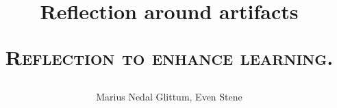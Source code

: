 \documentclass[a4paper, 12pt]{report}
\title{Reflection around artifacts
    \begin{center}
        \textsc{Reflection to enhance learning.}
    \end{center}
}
\author{Marius Nedal Glittum, Even Stene}
\begin{document}
\maketitle
{}





\tableofcontents

\listoffigures

\clearpage
{} 












%













\begin{appendices}
	
    
    
    
    
    
    
\end{appendices}





\end{document}
